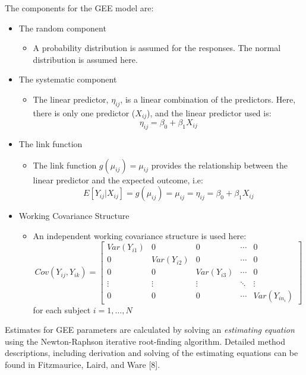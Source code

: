 \documentclass[12pt,]{article}
\providecommand{\tightlist}{%
  \setlength{\itemsep}{0pt}\setlength{\parskip}{0pt}}
\begin{document}
The components for the GEE model are:

\begin{itemize}
\tightlist
\item
  The random component

  \begin{itemize}
  \tightlist
  \item
    A probability distribution is assumed for the responses. The normal
    distribution is assumed here.
  \end{itemize}
\item
  The systematic component

  \begin{itemize}
  \tightlist
  \item
    The linear predictor, \(\eta_{ij}\), is a linear combination of the
    predictors. Here, there is only one predictor (\(X_{ij}\)), and the
    linear predictor used is:
    \[\eta_{ij} = \beta_{0} + \beta_{1} X_{ij}\]
  \end{itemize}
\item
  The link function

  \begin{itemize}
  \tightlist
  \item
    The link function \(g(\mu_{ij})=\mu_{ij}\) provides the relationship
    between the linear predictor and the expected outcome, i.e:
    \[E\left [Y_{ij} | X_{ij} \right ] = g(\mu_{ij}) = \mu_{ij}= \eta_{ij} = \beta_{0}+ \beta_{1} X_{ij}\]
  \end{itemize}
\item
  Working Covariance Structure

  \begin{itemize}
  \tightlist
  \item
    An independent working covariance structure is used here:
    \[Cov(Y_{ij}, Y_{ik})=
    \begin{bmatrix}
    Var(Y_{i1}) & 0 & 0 & \cdots & 0 \\
    0 & Var(Y_{i2}) & 0 & \cdots & 0 \\
    0 & 0 & Var(Y_{i3}) & \cdots & 0 \\
    \vdots & \vdots & \vdots & \ddots & \vdots \\
    0 & 0 & 0 & \cdots & Var(Y_{in_{i}})
    \end{bmatrix}
    \] for each subject \(i = 1,\ldots, N\)
  \end{itemize}
\end{itemize}

Estimates for GEE parameters are calculated by solving an
\textit{estimating equation} using the Newton-Raphson iterative
root-finding algorithm. Detailed method descriptions, including
derivation and solving of the estimating equations can be found in
Fitzmaurice, Laird, and Ware {[}8{]}.
\end{document}
